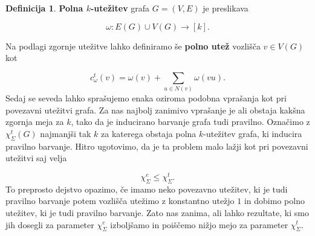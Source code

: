 \documentclass[12pt,a4paper,twoside]{article}
\theoremstyle{definition} %
\newtheorem{definicija}{Definicija}[section]
\theoremstyle{plain} %
\newcommand{\ec}{\chi_{\Sigma}^e}
\newcommand{\ect}{\chi_{\Sigma}^t}
\numberwithin{equation}{section}  %
\begin{document}
\begin{definicija}
\textbf{Polna $k$-utežitev} grafa $G=(V,E)$ je preslikava

$$ \omega : E(G) \cup V(G) \rightarrow [k]. $$
\end{definicija}
Na podlagi zgornje utežitve lahko definiramo še \textbf{polno utež} vozlišča $v \in V(G)$ kot

$$c_{\omega}^t(v)  = \omega(v) +  \sum_{u \in N(v)} \omega(vu).$$
Sedaj se seveda lahko sprašujemo enaka oziroma podobna vprašanja kot pri povezavni utežitvi grafa. Za nas najbolj zanimivo vprašanje je ali obstaja kakšna zgornja meja za $k$, tako da je inducirano barvanje grafa tudi pravilno. Označimo z $\ect(G)$ najmanjši tak $k$ za katerega obstaja polna $k$-utežitev grafa, ki inducira pravilno barvanje. Hitro ugotovimo, da je ta problem malo lažji kot pri povezavni utežitvi saj velja

$$ \ec \le \ect. $$
To preprosto dejstvo opazimo, če imamo neko povezavno utežitev, ki je tudi pravilno barvanje potem vozlišča utežimo z konstantno utežjo $1$ in dobimo polno utežitev, ki je tudi pravilno barvanje. Zato nas zanima, ali lahko rezultate, ki smo jih dosegli za parameter $\ec$ izboljšamo in poiščemo nižjo mejo za parameter $\ect$.
\end{document}
